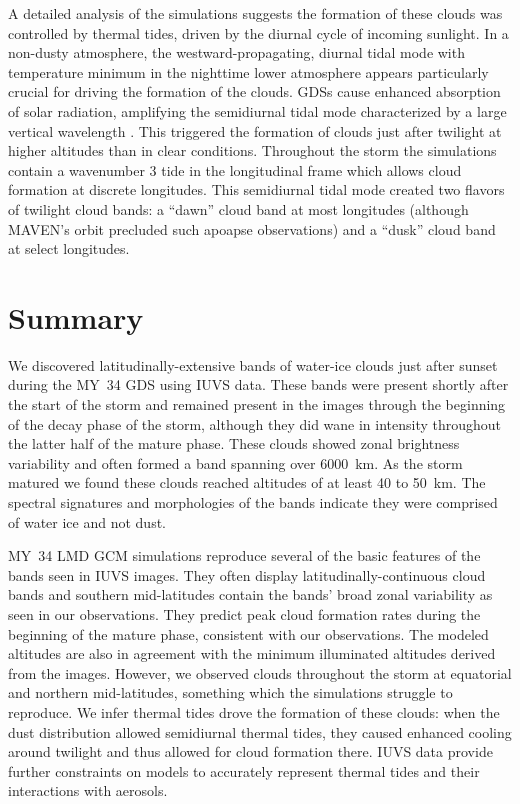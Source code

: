 \documentclass[draft]{agujournal2019}
\begin{document}
A detailed analysis of the simulations suggests the formation of these clouds was controlled by thermal tides, driven by the diurnal cycle of incoming sunlight. In a non-dusty atmosphere, the westward-propagating, diurnal tidal mode with temperature minimum in the nighttime lower atmosphere appears particularly crucial for driving the formation of the clouds. GDSs cause enhanced absorption of solar radiation, amplifying the semidiurnal tidal mode characterized by a large vertical wavelength \cite{Wilson96, Lewis05}. This triggered the formation of clouds just after twilight at higher altitudes than in clear conditions. Throughout the storm the simulations contain a wavenumber 3 tide in the longitudinal frame which allows cloud formation at discrete longitudes. This semidiurnal tidal mode created two flavors of twilight cloud bands: a ``dawn'' cloud band at most longitudes (although MAVEN's orbit precluded such apoapse observations) and a ``dusk'' cloud band at select longitudes.

\section{Summary}
We discovered latitudinally-extensive bands of water-ice clouds just after sunset during the MY~34 GDS using IUVS data. These bands were present shortly after the start of the storm and remained present in the images through the beginning of the decay phase of the storm, although they did wane in intensity throughout the latter half of the mature phase. These clouds showed zonal brightness variability and often formed a band spanning over 6000~km. As the storm matured we found these clouds reached altitudes of at least 40 to 50~km. The spectral signatures and morphologies of the bands indicate they were comprised of water ice and not dust.

MY~34 LMD GCM simulations reproduce several of the basic features of the bands seen in IUVS images. They often display latitudinally-continuous cloud bands and southern mid-latitudes contain the bands' broad zonal variability as seen in our observations. They predict peak cloud formation rates during the beginning of the mature phase, consistent with our observations. The modeled altitudes are also in agreement with the minimum illuminated altitudes derived from the images. However, we observed clouds throughout the storm at equatorial and northern mid-latitudes, something which the simulations struggle to reproduce. We infer thermal tides drove the formation of these clouds: when the dust distribution allowed semidiurnal thermal tides, they caused enhanced cooling around twilight and thus allowed for cloud formation there. IUVS data provide further constraints on models to accurately represent thermal tides and their interactions with aerosols.
\end{document}
